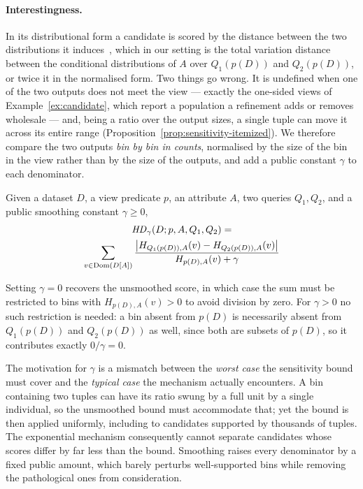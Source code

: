 \paragraph{Interestingness.}
In its distributional form a candidate is scored by the distance between the two distributions it induces~\cite{SeeDB,FEDEX}, which in our setting is the total variation distance between the conditional distributions of $A$ over $Q_1(p(D))$ and $Q_2(p(D))$, or twice it in the normalised form.
Two things go wrong.
It is undefined when one of the two outputs does not meet the view --- exactly the one-sided views of Example~\ref{ex:candidate}, which report a population a refinement adds or removes wholesale --- and, being a ratio over the output sizes, a single tuple can move it across its entire range (Proposition~\ref{prop:sensitivity-itemized}).
We therefore compare the two outputs \emph{bin by bin in counts}, normalised by the size of the bin in the view rather than by the size of the outputs, and add a public constant $\gamma$ to each denominator.

\begin{definition}
\label{def:hd}
Given a dataset $D$, a view predicate $p$, an attribute $A$, two queries $Q_1,Q_2$, and a public smoothing constant $\gamma \ge 0$,
\begin{multline}
\mathit{HD}_\gamma(D;p,A,Q_1,Q_2) = \\
\sum_{v\in \operatorname{Dom}(D[A])}
\frac{\big|H_{Q_1(p(D)),A}(v)-H_{Q_2(p(D)),A}(v)\big|}
     {H_{p(D),A}(v)+\gamma}
\label{eq:hd-definition}
\end{multline}
\end{definition}

Setting $\gamma=0$ recovers the unsmoothed score, in which case the sum must be restricted to bins with $H_{p(D),A}(v)>0$ to avoid division by zero.
For $\gamma>0$ no such restriction is needed: a bin absent from $p(D)$ is necessarily absent from $Q_1(p(D))$ and $Q_2(p(D))$ as well, since both are subsets of $p(D)$, so it contributes exactly $0/\gamma=0$.

The motivation for $\gamma$ is a mismatch between the \emph{worst case} the sensitivity bound must cover and the \emph{typical case} the mechanism actually encounters.
A bin containing two tuples can have its ratio swung by a full unit by a single individual, so the unsmoothed bound must accommodate that; yet the bound is then applied uniformly, including to candidates supported by thousands of tuples.
The exponential mechanism consequently cannot separate candidates whose scores differ by far less than the bound.
Smoothing raises every denominator by a fixed public amount, which barely perturbs well-supported bins while removing the pathological ones from consideration.

